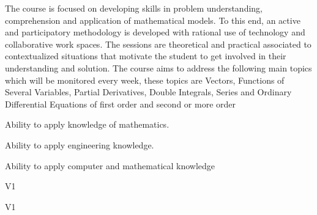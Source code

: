 \begin{syllabus}


\begin{justification}
  The course is focused on developing skills in problem understanding, comprehension and application of mathematical models. To this end, an active and participatory methodology is developed with rational use of technology and collaborative work spaces. The sessions are theoretical and practical associated to contextualized situations that motivate the student to get involved in their understanding and solution.
  The course aims to address the following main topics which will be monitored every week, these topics are Vectors, Functions of Several Variables, Partial Derivatives, Double Integrals, Series and Ordinary Differential Equations of first order and second or more order
\end{justification}

\begin{goals}
  \item Ability to apply knowledge of mathematics.
  \item Ability to apply engineering knowledge.
  \item Ability to apply computer and mathematical knowledge
\end{goals}

\begin{outcomes}{V1}
    \item {}  
    \item {}
\end{outcomes}

\begin{specificoutcomes}{V1}
  \item {}
  \item {}
  \item {}
  \item {}
  \item {}
  \item {}
  \item {}
  \item {}
\end{specificoutcomes}


\end{syllabus}

